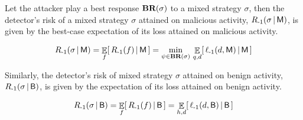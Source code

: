 \begin{proposition}
    Let the attacker play a best response $\textbf{BR}(\sigma)$ to a mixed strategy $\sigma$, then the detector's risk of a mixed strategy $\sigma$ attained on malicious activity, $R_{{\text{-}1}}(\sigma \,|\, \mathsf{M})$, is given by the best-case expectation of its loss attained on malicious activity.

    \begin{align}
        R_{{\text{-}1}}(\sigma \,|\, \mathsf{M}) = \mathop{\mathbb{E}}_f [\, R_{{\text{-}1}}(f) \,|\, \mathsf{M} \,] = \min_{\psi \in \textbf{BR}(\sigma) } \,
            \mathop{\mathbb{E}}_{q, d} [\, \ell_{{\text{-}1}} (d, \mathsf{M}) \,|\, \mathsf{M} \,]
    \end{align}

    Similarly, the detector's risk of mixed strategy $\sigma$ attained on benign activity, $R_{{\text{-}1}}(\sigma \,|\, \mathsf{B})$, is given by the expectation of its loss attained on benign activity.

    \begin{align}
        R_{{\text{-}1}}(\sigma \,|\, \mathsf{B}) = \mathop{\mathbb{E}}_f [\, R_{{\text{-}1}}(f) \,|\, \mathsf{B} \,] =
            \mathop{\mathbb{E}}_{h, d} [\, \ell_{{\text{-}1}} (d, \mathsf{B}) \,|\, \mathsf{B} \,]
    \end{align}

\end{proposition}

